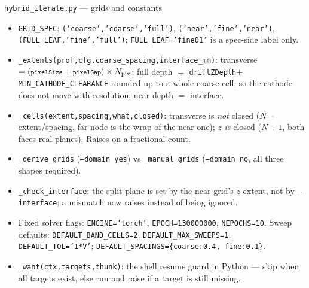 \documentclass[10pt,aspectratio=169]{beamer}
\newcommand{\ti}[1]{\texttt{\footnotesize #1}}
\begin{document}
\begin{frame}[allowframebreaks]{\texttt{hybrid\_iterate.py} --- grids and constants}
  \begin{itemize}\small
  \item \ti{GRID\_SPEC}: \ti{('coarse','coarse','full')}, \ti{('near','fine','near')},
        \ti{(FULL\_LEAF,'fine','full')}; \ti{FULL\_LEAF='fine01'} is a spec-side label only.
  \item \ti{\_extents(prof,cfg,coarse\_spacing,interface\_mm)}: transverse
        $=(\ti{pixelSize}+\ti{pixelGap})\times N_{\text{pix}}$; full depth $=$
        \ti{driftZDepth}$+$\ti{MIN\_CATHODE\_CLEARANCE} rounded up to a whole coarse cell, so
        the cathode does not move with resolution; near depth $=$ interface.
  \item \ti{\_cells(extent,spacing,what,closed)}: transverse is \emph{not} closed
        ($N=$extent/spacing, far node is the wrap of the near one); $z$ \emph{is} closed
        ($N+1$, both faces real planes). Raises on a fractional count.
  \item \ti{\_derive\_grids} (\ti{--domain yes}) vs \ti{\_manual\_grids} (\ti{--domain no},
        all three shapes required).
  \item \ti{\_check\_interface}: the split plane is set by the near grid's $z$ extent, not by
        \ti{--interface}; a mismatch now raises instead of being ignored.
  \item Fixed solver flags: \ti{ENGINE='torch'}, \ti{EPOCH=130000000}, \ti{NEPOCHS=10}.
        Sweep defaults: \ti{DEFAULT\_BAND\_CELLS=2}, \ti{DEFAULT\_MAX\_SWEEPS=1},
        \ti{DEFAULT\_TOL='1*V'}; \ti{DEFAULT\_SPACINGS=\{coarse:0.4, fine:0.1\}}.
  \item \ti{\_want(ctx,targets,thunk)}: the shell resume guard in Python --- skip when all
        targets exist, else run and raise if a target is still missing.
  \end{itemize}
\end{frame}
\end{document}
